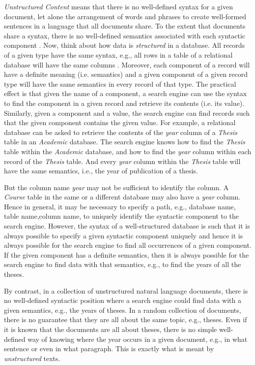 \textit{Unstructured Content} means that there is no well-defined syntax for a given document, let alone the arrangement of words and phrases to create well-formed sentences in a language that all documents share. To the extent that documents share a syntax, there is no well-defined semantics associated with each syntactic component \citep{greengrass2000}. Now, think about how data is \textit{structured} in a database. All records of a given type have the same syntax, e.g., all rows in a table of a relational database will have the same columns \citep{Salton1983}.  Moreover,  each  component  of  a  record  will  have  a  definite meaning (i.e. semantics)  and  a  given  component  of  a  given  record  type  will  have  the  same semantics in every record of that type. The practical effect is that given the name of a component, a search engine can use the syntax to find the component in a given record and retrieve its contents (i.e. its value). Similarly, given a component and a value, the search engine can find records such that the given component contains the given value. For example, a relational database can be asked to retrieve the contents of the \textit{year} column of a \textit{Thesis} table in an \textit{Academic} database. The search engine knows how to find the \textit{Thesis} table within  the  \textit{Academic}  database,  and  how  to  find  the  \textit{year}  column  within  each  record  of  the \textit{Thesis} table.  And  every  \textit{year}  column  within  the  \textit{Thesis}  table  will  have  the  same semantics, i.e., the year of publication of a thesis. 

But the column name \textit{year} may not be sufficient to identify the column. A \textit{Course} table in the same or a different database may also have a \textit{year} column. Hence in general, it may be necessary to specify a path, e.g., database name, table name,column name, to uniquely identify the syntactic component to the search engine. However, the syntax of a well-structured database is such that it is always possible to specify a given syntactic component uniquely and hence it is always possible for the search engine to find all occurrences of a given component. If the given component has a definite semantics, then it is always possible for the search engine to find data with that semantics, e.g., to find the years of all the theses. 

By contrast, in a collection of unstructured natural language documents, there is no well-defined syntactic position where a search engine could find data with a given semantics, e.g., the years of theses. In a random collection of documents, there is no guarantee that they are all about the same topic, e.g., theses. Even if it is known that the documents are all about theses, there is no simple well-defined way of knowing where the year occurs in a given document, e.g., in what sentence or even in what paragraph. This is exactly what is meant by \textit{unstructured} texts.

